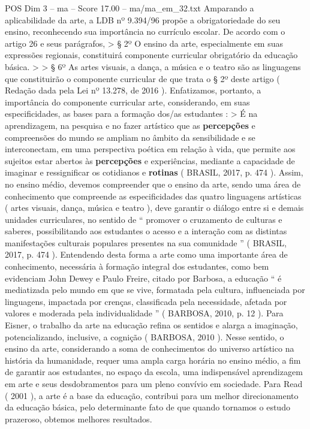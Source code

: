 \begin{textsample}{POS Dim 3 – ma – Score 17.00 – ma/ma\_em\_32.txt}
Amparando a aplicabilidade da arte, a LDB nº 9.394/96 propõe a obrigatoriedade do seu ensino, reconhecendo sua importância no currículo escolar.
De acordo com o artigo 26 e seus parágrafos, > § 2º O ensino da arte, especialmente em suas expressões regionais, constituirá componente curricular obrigatório da educação básica. > > § 6º As artes visuais, a dança, a música e o teatro são as linguagens que constituirão o componente curricular de que trata o § 2º deste artigo ( Redação dada pela Lei nº 13.278, de 2016 ).
Enfatizamos, portanto, a importância do componente curricular arte, considerando, em suas especificidades, as bases para a formação dos/as estudantes : > É na aprendizagem, na pesquisa e no fazer artístico que as \textbf{percepções} e compreensões do mundo se ampliam no âmbito da sensibilidade e se interconectam, em uma perspectiva poética em relação à vida, que permite aos sujeitos estar abertos às \textbf{percepções} e experiências, mediante a capacidade de imaginar e ressignificar os cotidianos e \textbf{rotinas} ( BRASIL, 2017, p. 474 ).
Assim, no ensino médio, devemos compreender que o ensino da arte, sendo uma área de conhecimento que compreende as especificidades das quatro linguagens artísticas ( artes visuais, dança, música e teatro ), deve garantir o diálogo entre si e demais unidades curriculares, no sentido de “ promover o cruzamento de culturas e saberes, possibilitando aos estudantes o acesso e a interação com as distintas manifestações culturais populares presentes na sua comunidade ” ( BRASIL, 2017, p. 474 ).
Entendendo desta forma a arte como uma importante área de conhecimento, necessária à formação integral dos estudantes, como bem evidenciam John Dewey e Paulo Freire, citado por Barbosa, a educação “ é mediatizada pelo mundo em que se vive, formatada pela cultura, influenciada por linguagens, impactada por crenças, classificada pela necessidade, afetada por valores e moderada pela individualidade ” ( BARBOSA, 2010, p. 12 ).
Para Eisner, o trabalho da arte na educação refina os sentidos e alarga a imaginação, potencializando, inclusive, a cognição ( BARBOSA, 2010 ).
Nesse sentido, o ensino da arte, considerando a soma de conhecimentos do universo artístico na história da humanidade, requer uma ampla carga horária no ensino médio, a fim de garantir aos estudantes, no espaço da escola, uma indispensável aprendizagem em arte e seus desdobramentos para um pleno convívio em sociedade.
Para Read ( 2001 ), a arte é a base da educação, contribui para um melhor direcionamento da educação básica, pelo determinante fato de que quando tornamos o estudo prazeroso, obtemos melhores resultados.

\end{textsample}

